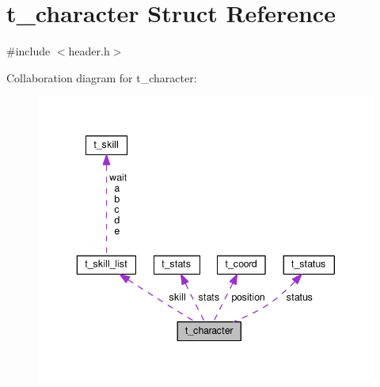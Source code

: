\hypertarget{structt__character}{\section{t\-\_\-character Struct Reference}
\label{structt__character}
}


{\ttfamily \#include $<$header.\-h$>$}



Collaboration diagram for t\-\_\-character\-:
\nopagebreak
\begin{figure}[H]
\begin{center}
\leavevmode
\includegraphics[width=343pt]{structt__character__coll__graph}
\end{center}
\end{figure}
